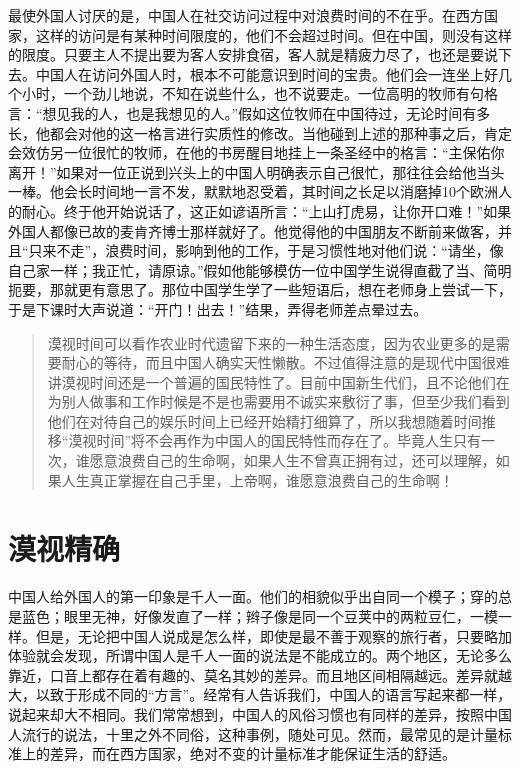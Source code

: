 \documentclass[12pt,oneside]{book}
\begin{document}
\begin{common-format}
最使外国人讨厌的是，中国人在社交访问过程中对浪费时间的不在乎。在西方国家，这样的访问是有某种时间限度的，他们不会超过时间。但在中国，则没有这样的限度。只要主人不提出要为客人安排食宿，客人就是精疲力尽了，也还是要说下去。中国人在访问外国人时，根本不可能意识到时间的宝贵。他们会一连坐上好几个小时，一个劲儿地说，不知在说些什么，也不说要走。一位高明的牧师有句格言：“想见我的人，也是我想见的人。”假如这位牧师在中国待过，无论时间有多长，他都会对他的这一格言进行实质性的修改。当他碰到上述的那种事之后，肯定会效仿另一位很忙的牧师，在他的书房醒目地挂上一条圣经中的格言：“主保佑你离开！”如果对一位正说到兴头上的中国人明确表示自己很忙，那往往会给他当头一棒。他会长时间地一言不发，默默地忍受着，其时间之长足以消磨掉10个欧洲人的耐心。终于他开始说话了，这正如谚语所言：“上山打虎易，让你开口难！”如果外国人都像已故的麦肯齐博士那样就好了。他觉得他的中国朋友不断前来做客，并且“只来不走”，浪费时间，影响到他的工作，于是习惯性地对他们说：“请坐，像自己家一样；我正忙，请原谅。”假如他能够模仿一位中国学生说得直截了当、简明扼要，那就更有意思了。那位中国学生学了一些短语后，想在老师身上尝试一下，于是下课时大声说道：“开门！出去！”结果，弄得老师差点晕过去。

\begin{quotation}
漠视时间可以看作农业时代遗留下来的一种生活态度，因为农业更多的是需要耐心的等待，而且中国人确实天性懒散。不过值得注意的是现代中国很难讲漠视时间还是一个普遍的国民特性了。目前中国新生代们，且不论他们在为别人做事和工作时候是不是也需要用不诚实来敷衍了事，但至少我们看到他们在对待自己的娱乐时间上已经开始精打细算了，所以我想随着时间推移“漠视时间”将不会再作为中国人的国民特性而存在了。毕竟人生只有一次，谁愿意浪费自己的生命啊，如果人生不曾真正拥有过，还可以理解，如果人生真正掌握在自己手里，上帝啊，谁愿意浪费自己的生命啊！
\end{quotation}


\chapter{漠视精确}
中国人给外国人的第一印象是千人一面。他们的相貌似乎出自同一个模子；穿的总是蓝色；眼里无神，好像发直了一样；辫子像是同一个豆荚中的两粒豆仁，一模一样。但是，无论把中国人说成是怎么样，即使是最不善于观察的旅行者，只要略加体验就会发现，所谓中国人是千人一面的说法是不能成立的。两个地区，无论多么靠近，口音上都存在着有趣的、莫名其妙的差异。而且地区间相隔越远。差异就越大，以致于形成不同的“方言”。经常有人告诉我们，中国人的语言写起来都一样，说起来却大不相同。我们常常想到，中国人的风俗习惯也有同样的差异，按照中国人流行的说法，十里之外不同俗，这种事例，随处可见。然而，最常见的是计量标准上的差异，而在西方国家，绝对不变的计量标准才能保证生活的舒适。 


\end{common-format}
\end{document}
